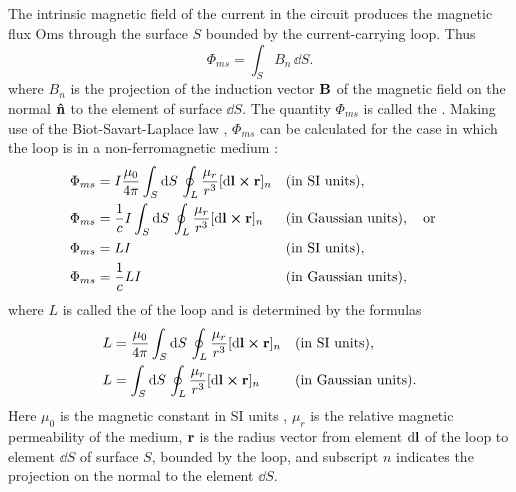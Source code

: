 \subsection{}\label{25.2.2} The intrinsic magnetic field of the current in the circuit produces the magnetic flux Oms through the surface $S$ bounded by the current-carrying loop. Thus
\begin{equation*}%
\Phi_{ms} = \int_{S} B_{n} \, \dd S.
\end{equation*}
where $B_{n}$ is the projection of the induction vector $\vb{B}$ of the magnetic field  on the normal $\vu{n}$ to the element of surface $\dd S$. The quantity $\Phi_{ms}$ is called the . Making use of the Biot-Savart-Laplace law , $\Phi_{ms}$ can be calculated for the case in which the loop is in a non-ferromagnetic medium :
\begin{align*}%
\Phi_{ms} & = I \frac{\mu_{0}}{4 \pi} \int_{S} \dd S \, \oint_{L} \frac{\mu_{r}}{r^{3}} [\dd\vb{l} \cross 	\vb{r}]_{n}&& \text{(in SI units),} \\
\Phi_{ms} & = \frac{1}{c}I \int_{S} \dd S \, \oint_{L} \frac{\mu_{r}}{r^{3}} [\dd\vb{l} \cross 	\vb{r}]_{n} &&  \text{(in Gaussian units)}, \qor \\
\Phi_{ms} & = LI && \text{(in SI units),} \\
\Phi_{ms} & = \frac{1}{c}LI &&  \text{(in Gaussian units)},
\end{align*}
where $L$ is called the  of the loop and is determined by the formulas
\begin{align*}%
L & = \frac{\mu_{0}}{4 \pi} \int_{S} \dd S \, \oint_{L} \frac{\mu_{r}}{r^{3}} [\dd\vb{l} \cross 	\vb{r}]_{n}&& \text{(in SI units),} \\
L & = \int_{S} \dd S \, \oint_{L} \frac{\mu_{r}}{r^{3}} [\dd\vb{l} \cross 	\vb{r}]_{n} &&  \text{(in Gaussian units).}
\end{align*}
Here $\mu_{0}$ is the magnetic constant in SI units , $\mu_{r}$ is the relative magnetic permeability of the medium, $\vb{r}$ is the radius vector from element $\dd \vb{l}$ of the loop to element $\dd S$ of surface $S$, bounded by the loop, and subscript $n$ indicates the projection on the normal to the element $\dd S$.


